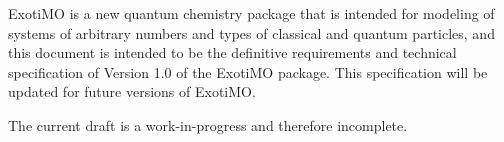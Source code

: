 \label{Purpose}

ExotiMO is a new quantum chemistry package that is intended
for modeling of systems of arbitrary numbers and types of 
classical and quantum particles, and 
this document is intended to be the definitive
requirements and technical specification of Version 1.0 of the ExotiMO package.  
This specification will be updated for future versions of ExotiMO.

The current draft is a
work-in-progress and therefore incomplete.

